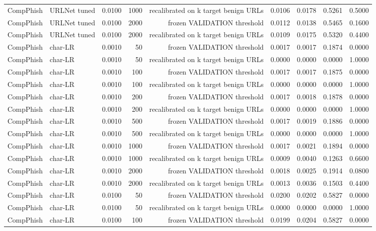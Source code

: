 \begin{table}[t]
\begin{tabular}{llrrrrrrr}
CompPhish & URLNet tuned & 0.0100 & 1000 & recalibrated on k target benign URLs & 0.0106 & 0.0178 & 0.5261 & 0.5000 \\
CompPhish & URLNet tuned & 0.0100 & 2000 & frozen VALIDATION threshold & 0.0112 & 0.0138 & 0.5465 & 0.1600 \\
CompPhish & URLNet tuned & 0.0100 & 2000 & recalibrated on k target benign URLs & 0.0109 & 0.0175 & 0.5320 & 0.4400 \\
CompPhish & char-LR & 0.0010 & 50 & frozen VALIDATION threshold & 0.0017 & 0.0017 & 0.1874 & 0.0000 \\
CompPhish & char-LR & 0.0010 & 50 & recalibrated on k target benign URLs & 0.0000 & 0.0000 & 0.0000 & 1.0000 \\
CompPhish & char-LR & 0.0010 & 100 & frozen VALIDATION threshold & 0.0017 & 0.0017 & 0.1875 & 0.0000 \\
CompPhish & char-LR & 0.0010 & 100 & recalibrated on k target benign URLs & 0.0000 & 0.0000 & 0.0000 & 1.0000 \\
CompPhish & char-LR & 0.0010 & 200 & frozen VALIDATION threshold & 0.0017 & 0.0018 & 0.1878 & 0.0000 \\
CompPhish & char-LR & 0.0010 & 200 & recalibrated on k target benign URLs & 0.0000 & 0.0000 & 0.0000 & 1.0000 \\
CompPhish & char-LR & 0.0010 & 500 & frozen VALIDATION threshold & 0.0017 & 0.0019 & 0.1886 & 0.0000 \\
CompPhish & char-LR & 0.0010 & 500 & recalibrated on k target benign URLs & 0.0000 & 0.0000 & 0.0000 & 1.0000 \\
CompPhish & char-LR & 0.0010 & 1000 & frozen VALIDATION threshold & 0.0017 & 0.0021 & 0.1894 & 0.0000 \\
CompPhish & char-LR & 0.0010 & 1000 & recalibrated on k target benign URLs & 0.0009 & 0.0040 & 0.1263 & 0.6600 \\
CompPhish & char-LR & 0.0010 & 2000 & frozen VALIDATION threshold & 0.0018 & 0.0025 & 0.1914 & 0.0800 \\
CompPhish & char-LR & 0.0010 & 2000 & recalibrated on k target benign URLs & 0.0013 & 0.0036 & 0.1503 & 0.4400 \\
CompPhish & char-LR & 0.0100 & 50 & frozen VALIDATION threshold & 0.0200 & 0.0202 & 0.5827 & 0.0000 \\
CompPhish & char-LR & 0.0100 & 50 & recalibrated on k target benign URLs & 0.0000 & 0.0000 & 0.0000 & 1.0000 \\
CompPhish & char-LR & 0.0100 & 100 & frozen VALIDATION threshold & 0.0199 & 0.0204 & 0.5827 & 0.0000 \\

\end{tabular}
\end{table}

